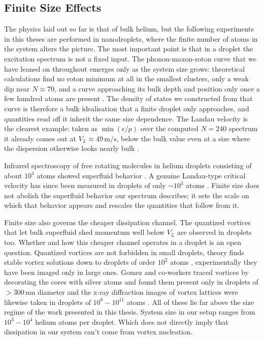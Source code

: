 \subsection{Finite Size Effects}
\label{sec:finite_size}
The physics laid out so far is that of bulk helium, but the following experiments in this theses are performed in nanodroplets, where the finite number of atoms in the system alters the picture. The most important point is that in a droplet the excitation spectrum is not a fixed input. The phonon-maxon-roton curve that we have leaned on throughout emerges only as the system size grows: theoretical calculations find no roton minimum at all in the smallest clusters, only a weak dip near $N \approx 70$, and a curve approaching its bulk depth and position only once a few hundred atoms are present \cite{ramakrishnaCollectiveExcitationsHelium1990, guardiolaExcitedStates4He2001}. The density of states we constructed from that curve is therefore a bulk idealisation that a finite droplet only approaches, and quantities read off it inherit the same size dependence. The Landau velocity is the clearest example: taken as $\min(\epsilon/p)$ over the computed $N = 240$ spectrum it already comes out at $V_L \approx 49\,\mathrm{m/s}$, below the bulk value even at a size where the dispersion otherwise looks nearly bulk \cite{ramakrishnaCollectiveExcitationsHelium1990}. 

Infrared spectroscopy of free rotating molecules in helium droplets consisting of about $10^4$ atoms showed superfluid behavior \cite{grebenevSuperfluiditySmallHelium41998}. A genuine Landau-type critical velocity has since been measured in droplets of only $\sim\!10^3$ atoms \cite{brauerCriticalLandauVelocity2013}. Finite size does not abolish the superfluid behavior our spectrum describes; it sets the scale on which that behavior appears and rescales the quantities that follow from it.

Finite size also governs the cheaper dissipation channel. The quantized vortices that let bulk superfluid shed momentum well below $V_L$ are observed in droplets too. Whether and how this cheaper channel operates in a droplet is an open question. Quantized vortices are not forbidden in small droplets, theory finds stable vortex solutions down to droplets of order $10^2$ atoms \cite{lehmannEnergeticsPossibleFormation2003}, experimentally they have been imaged only in large ones. Gomez and co-workers traced vortices by decorating the cores with silver atoms and found them present only in droplets of  $>300 \, \mathrm{nm}$ diameter \cite{gomezTracesVorticesSuperfluid2012} and the x-ray diffraction images of vortex lattices were likewise taken in droplets of $10^8 -10^{11}$ atoms \cite{gomezShapesVorticitiesSuperfluid2014}. 
All of these lie far above the size regime of the work presented in this thesis. System size in our setup ranges from $10^3-10^4$ helium atoms per droplet.  Which does not directly imply that dissipation in our system can't come from vortex nucleation. 

